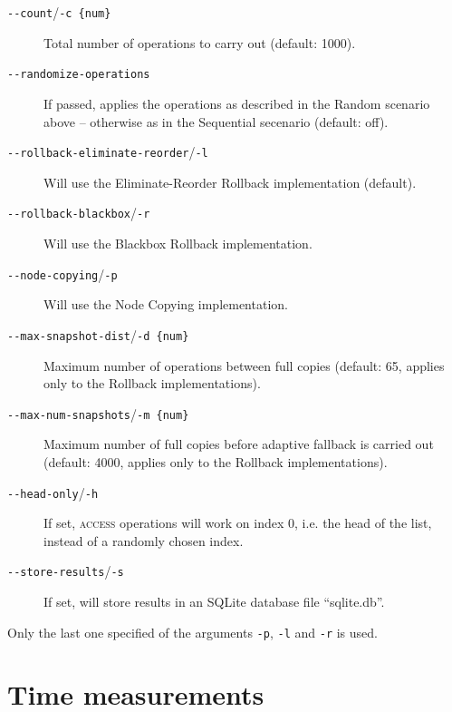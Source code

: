 \begin{description}

  \item[\texttt{-\@{}-count}/\texttt{-c \{num\}}] Total number of operations to
  carry out (default: 1000).

  \item[\texttt{-\@{}-randomize-operations}] If passed, applies the operations
  as described in the Random scenario above -- otherwise as in the Sequential
  secenario (default: off).

  \item[\texttt{-\@{}-rollback-eliminate-reorder}/\texttt{-l}] Will use the
  Eliminate-Reorder Rollback implementation (default).

  \item[\texttt{-\@{}-rollback-blackbox}/\texttt{-r}] Will use the Blackbox
  Rollback implementation.

  \item[\texttt{-\@{}-node-copying}/\texttt{-p}] Will use the Node Copying
  implementation.

  \item[\texttt{-\@{}-max-snapshot-dist}/\texttt{-d \{num\}}] Maximum number of
  operations between full copies (default: 65, applies only to the Rollback
  implementations).

  \item[\texttt{-\@{}-max-num-snapshots}/\texttt{-m \{num\}}] Maximum number of
  full copies before adaptive fallback is carried out (default: 4000, applies
  only to the Rollback implementations).

  \item[\texttt{-\@{}-head-only}/\texttt{-h}] If set, \textsc{access} operations
  will work on index 0, i.e. the head of the list, instead of a randomly chosen
  index.

  \item[\texttt{-\@{}-store-results}/\texttt{-s}] If set, will store results in
  an SQLite database file ``sqlite.db''.
  
\end{description}

Only the last one specified of the arguments \texttt{-p}, \texttt{-l} and
\texttt{-r} is used.

\section{Time measurements}
\label{sec:time-results}

